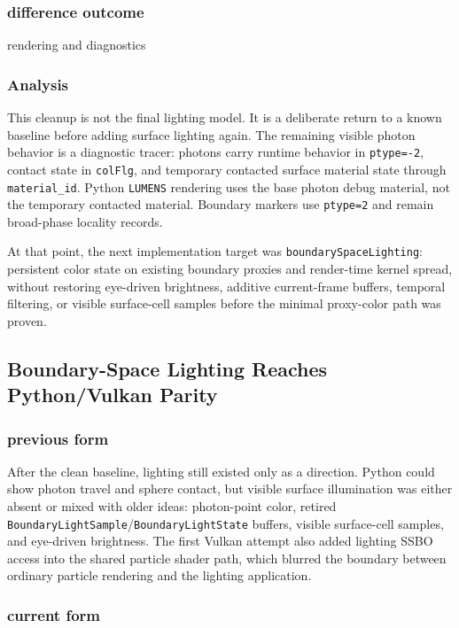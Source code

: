 \subsubsection{difference outcome}

rendering and diagnostics

\subsubsection{Analysis}

This cleanup is not the final lighting model.  It is a deliberate return to a
known baseline before adding surface lighting again.  The remaining visible
photon behavior is a diagnostic tracer: photons carry runtime behavior in
\texttt{ptype=-2}, contact state in \texttt{colFlg}, and temporary contacted
surface material state through \texttt{material\_id}.  Python
\texttt{LUMENS} rendering uses the base photon debug material, not the
temporary contacted material.  Boundary markers use \texttt{ptype=2} and
remain broad-phase locality records.

At that point, the next implementation target was
\texttt{boundarySpaceLighting}: persistent color state on existing boundary
proxies and render-time kernel spread, without restoring eye-driven
brightness, additive current-frame buffers, temporal filtering, or visible
surface-cell samples before the minimal proxy-color path was proven.

\subsection{Boundary-Space Lighting Reaches Python/Vulkan Parity}

\subsubsection{previous form}

After the clean baseline, lighting still existed only as a direction.  Python
could show photon travel and sphere contact, but visible surface illumination
was either absent or mixed with older ideas: photon-point color, retired
\texttt{BoundaryLightSample}/\texttt{BoundaryLightState} buffers, visible
surface-cell samples, and eye-driven brightness.  The first Vulkan attempt
also added lighting SSBO access into the shared particle shader path, which
blurred the boundary between ordinary particle rendering and the lighting
application.

\subsubsection{current form}

